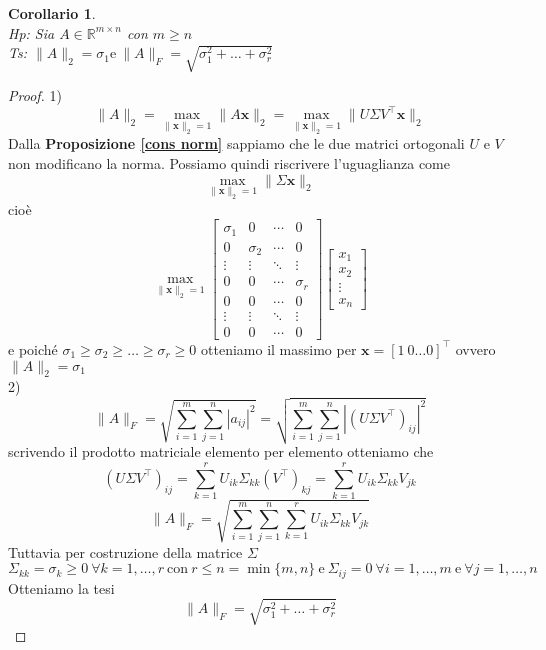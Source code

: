 \documentclass[11pt]{article}
\newtheorem{corollary}{Corollario}
\newcommand{\R}{\mathbb{R}} %
\begin{document}
\begin{corollary}\label{cor 4}
\textbf{}\\
\textit{Hp:} Sia $A\in \R^{m \times n}$ con $m \geq n$ \\
\textit{Ts:} $\|A\|_2=\sigma_1 \text{e} \  \|A\|_F=\sqrt{\sigma_1^2 + \dots + \sigma_r^2}$
\end{corollary}
\begin{proof}
1) \[ \|A\|_2 = \max_{\|\mathbf{x}\|_2 =1} \|A\mathbf{x}\|_2 = \max_{\|\mathbf{x}\|_2 =1} \| U \Sigma V^\top       \mathbf{x} \|_2 \]
Dalla \textbf{Proposizione \ref{cons norm}} sappiamo che le due matrici ortogonali $U$ e $V$ non modificano la norma. Possiamo quindi riscrivere l'uguaglianza come $$\max_{\|\mathbf{x}\|_2 =1} \|\Sigma \mathbf{x}\|_2 $$ cioè $$\max_{\|\mathbf{x}\|_2 =1} \begin{bmatrix}
\sigma_1 & 0 & \cdots & 0 \\
0 & \sigma_2 & \cdots & 0 \\
\vdots & \vdots & \ddots & \vdots \\
0 & 0 & \cdots & \sigma_r \\
0 & 0 & \cdots & 0 \\
\vdots & \vdots & \ddots & \vdots \\
0 & 0 & \cdots & 0
\end{bmatrix} \begin{bmatrix}
x_1 \\
x_2 \\
\vdots \\
x_n
\end{bmatrix}$$ 
e poiché $\sigma_1 \geq \sigma_2 \geq \dots \geq \sigma_r \geq 0$ otteniamo il massimo per $\mathbf{x}=[1 \ 0 \dots 0]^\top      $ ovvero $\|A\|_2= \sigma_1$
\\2)$$\|A\|_F=\sqrt{\sum_{i=1}^m\sum_{j=1}^n|a_{ij}|^2}=\sqrt{\sum_{i=1}^m\sum_{j=1}^n|(U\Sigma V^\top      )_{ij}|^2}$$
scrivendo il prodotto matriciale elemento per elemento otteniamo che $$(U\Sigma V^\top      )_{ij} = \sum_{k=1}^{r} U_{ik} \Sigma_{kk} (V^\top      )_{kj}=\sum_{k=1}^{r} U_{ik} \Sigma_{kk}V_{jk}$$
$$ \|A\|_F=\sqrt{\sum_{i=1}^m\sum_{j=1}^n \sum_{k=1}^{r} U_{ik} \Sigma_{kk}V_{jk}} $$ 
Tuttavia per costruzione della matrice $\Sigma$ $$\Sigma_{kk}=\sigma_k \geq 0 \ \forall k=1,\dots,r \ \text{con} \ r\leq n=\min{\{m,n\}} \ \text{e} \ \Sigma_{ij}=0 \ \forall i=1, \dots, m \ \text{e} \ \forall j=1, \dots, n$$
Otteniamo la tesi $$\|A\|_F=\sqrt{\sigma_1^2 + \dots + \sigma_r^2}$$

\end{proof}
\end{document}
